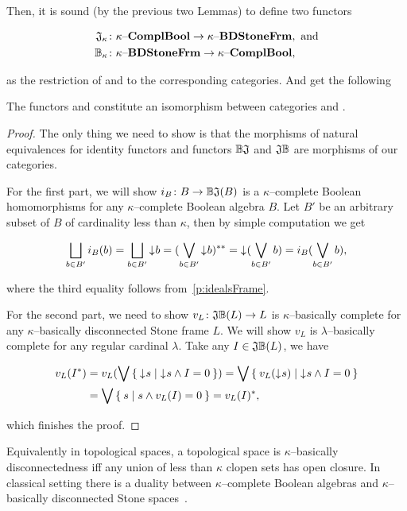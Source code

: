 Then, it is sound (by the previous two Lemmas) to define two functors

\begin{align*}
    \mathfrak{J}_{\kappa}&\colon \kappa\text{--}\mathbf{ComplBool} \to \kappa\text{--}\mathbf{BDStoneFrm}, \text{ and} \\
    \mathbb{B}_{\kappa}&\colon \kappa\text{--}\mathbf{BDStoneFrm} \to \kappa\text{--}\mathbf{ComplBool},
\end{align*}

\noindent as the restriction of \JO{} and \BcO{} to the corresponding categories. And get the following

\begin{theorem*}\label{p:kappaDuality}
    The functors \JK{} and \BcK{} constitute an isomorphism between categories \kComplBool{} and \kBDStoneFrm.
\end{theorem*}
\begin{proof}
    The only thing we need to show is that the morphisms of natural equivalences for identity functors and functors $\mathbb{B}\mathfrak{J}$ and $\mathfrak{J}\mathbb{B}$ are morphisms of our categories.

    For the first part, we will show $i_B\colon B \to \mathbb{B}\mathfrak{J}(B)$ is a $\kappa$--complete Boolean homomorphisms for any $\kappa$--complete Boolean algebra $B$. Let $B'$ be an arbitrary subset of $B$ of cardinality less than $\kappa$, then by simple computation we get

    $$
        \bigsqcup_{b\in B'} i_B(b) = \bigsqcup_{b\in B'} \mathord{\downarrow}\mkern1mu b = (\bigvee_{b\in B'} \mathord{\downarrow}\mkern1mu b)^{**} = \mathord{\downarrow}\mkern1mu (\bigvee_{b\in B'} b) = i_B(\bigvee_{b\in B'} b),
    $$

    \noindent where the third equality follows from~\ref{p:idealsFrame}.

    For the second part, we need to show $v_L\colon \mathfrak{J}\mathbb{B}(L) \to L$ is $\kappa$--basically complete for any $\kappa$--basically disconnected Stone frame $L$. We will show $v_L$ is $\lambda$--basically complete for any regular cardinal $\lambda$. Take any $I \in \mathfrak{J}\mathbb{B}(L)$, we have

    \begin{align*}
        v_L(I^*) &= v_L(\bigvee \Set{ \mathord{\downarrow}\mkern1mus | \mathord{\downarrow}\mkern1mus \wedge I = 0 })
                  = \bigvee \Set{ v_L(\mathord{\downarrow}\mkern1mus) | \mathord{\downarrow}\mkern1mus \wedge I = 0 } \\
                 &= \bigvee \Set{ s | s \wedge v_L(I) = 0 } = v_L(I)^*,
    \end{align*}

    \noindent which finishes the proof.
\end{proof}

Equivalently in topological spaces, a topological space is $\kappa$--basically disconnectedness iff any union of less than $\kappa$ clopen sets has open closure. In classical setting there is a duality between $\kappa$--complete Boolean algebras and $\kappa$--basically disconnected Stone spaces~\cite{monk1989handbook}.


